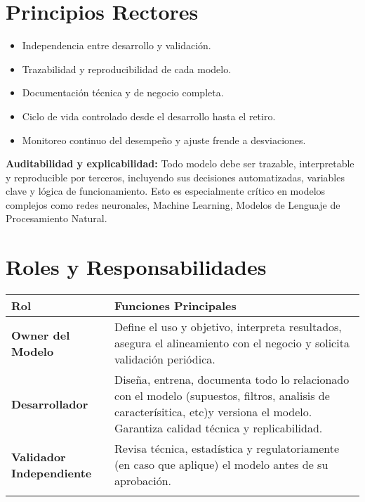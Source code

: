 \documentclass[11pt,oneside]{article}%
\begin{document}
\section{Principios Rectores}
\begin{itemize}
\item Independencia entre desarrollo y validación. 
\item Trazabilidad y reproducibilidad de cada modelo. 
\item Documentación técnica y de negocio completa. 
\item Ciclo de vida controlado desde el desarrollo hasta el retiro. 
\item Monitoreo continuo del desempeño y ajuste frende a desviaciones. 
\end{itemize}

\textbf{Auditabilidad y explicabilidad:} Todo modelo debe ser trazable, interpretable y reproducible por terceros, incluyendo sus decisiones automatizadas, variables clave y lógica de funcionamiento. Esto es especialmente crítico en modelos complejos como redes neuronales, Machine Learning, Modelos de Lenguaje de Procesamiento Natural. 

\section{Roles y Responsabilidades}

\begin{longtable}{>{\bfseries}p{5cm}  p{10cm}}
\toprule
\rowcolor{ficoblue}
\color{white}\textbf{Rol}  & \color{white}\textbf{Funciones Principales} \\
 \midrule
Owner del Modelo           & Define el uso y objetivo, interpreta resultados, asegura el alineamiento con el negocio y solicita validación periódica. \\
\addlinespace
Desarrollador                  & Diseña, entrena, documenta todo lo relacionado con el modelo (supuestos, filtros, analisis de caracterísitica, etc)y versiona el modelo. Garantiza calidad técnica y replicabilidad.\\
\addlinespace
Validador Independiente  & Revisa técnica, estadística y regulatoriamente (en caso que aplique) el modelo antes de su aprobación. \\ 
\addlinespace
\bottomrule
\end{longtable}
\end{document}
